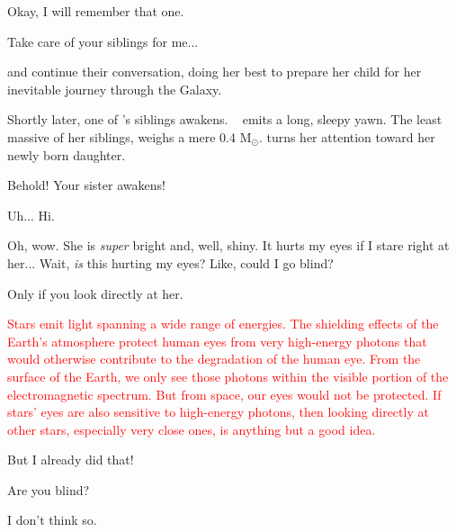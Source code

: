 \documentclass[main.tex]{subfiles}
\begin{document}
\par \Maia Okay, I will remember that one.

\par \Pleione Take care of your siblings for me...

\par \nar \rmmaia and \rmpleione continue their conversation, \rmpleione doing her best to prepare her child for her inevitable journey through the Galaxy.  

\par \nar Shortly later, one of \rmmaia's siblings awakens.  \rmelectra~ emits a long, sleepy yawn.  The least massive of her siblings, \rmelectra weighs a mere 0.4 M$_{\odot}$.  \rmpleione turns her attention toward her newly born daughter.

\par \Pleione Behold!  Your sister awakens!

\par \Electra  Uh... Hi.

\par \Maia Oh, wow.  She is \textit{super} bright and, well, shiny.  It hurts my eyes if I stare right at her... Wait, \textit{is} this hurting my eyes?  Like, could I go blind?

\par \Pleione Only if you look directly at her.

\begin{tcolorbox}[sharp corners, colback=red!30, colframe=red!80!blue, title=Stellar Emission]
\par \textcolor{red} {Stars emit light spanning a wide range of energies.  The shielding effects of the Earth's atmosphere protect human eyes from very high-energy photons that would otherwise contribute to the degradation of the human eye.  From the surface of the Earth, we only see those photons within the visible portion of the electromagnetic spectrum.  But from space, our eyes would not be protected.  If stars' eyes are also sensitive to high-energy photons, then looking directly at other stars, especially very close ones, is anything but a good idea.}
\end{tcolorbox}

\par \Maia But I already did that!

\par \Pleione Are you blind?

\par \Maia I don't think so.
\end{document}
